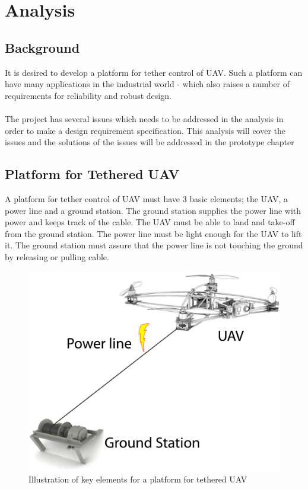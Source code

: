 
\chapter{Analysis}

\section{Background}
It is desired to develop a platform for tether control of UAV. Such a platform can have many applications in the industrial world - which also raises a number of requirements for reliability and robust design. \\
\\
The project has several issues which needs to be addressed in the analysis in order to make a design requirement specification. This analysis will cover the issues and the solutions of the issues will be addressed in the prototype chapter 


\section{Platform for Tethered UAV}
A platform for tether control of UAV must have 3 basic elements; the UAV, a power line and a ground station. The ground station supplies the power line with power and keeps track of the cable. The UAV must be able to land and take-off from the ground station. The power line must be light enough for the UAV to lift it. The ground station must assure that the power line is not touching the ground by releasing or pulling cable.

\begin{figure}[H]
\centering
\includegraphics[scale=0.5]{graphics/overall-system.png}
\caption{Illustration of key elements for a platform for tethered UAV}
\end{figure}




